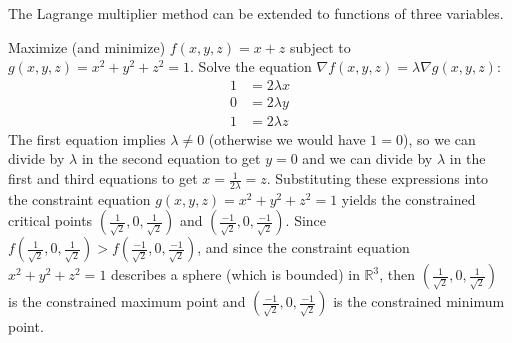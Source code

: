 The Lagrange multiplier method can be extended to functions of three variables.

\begin{example}\label{ex_lagr_3var}
Maximize (and minimize) $f(x,y,z) = x+z$ subject to $g(x,y,z) = x^2 + y^2 + z^2 = 1$.
\solution
Solve the equation $\nabla f(x,y,z) = \lambda \nabla g(x,y,z)$:
 \begin{align*}
  1 &= 2\lambda x\\
  0 &= 2\lambda y\\
  1 &= 2\lambda z
 \end{align*}
 The first equation implies $\lambda \ne 0$ (otherwise we would have $1=0$), so we can divide by $\lambda$ in the second equation to get $y=0$ and we can divide by $\lambda$ in the first and third equations to get $x=\frac1{2\lambda}=z$. Substituting these expressions into the constraint equation $g(x,y,z) = x^2 + y^2 + z^2 = 1$ yields the constrained critical points $\left( \frac1{\sqrt2},0,\frac1{\sqrt2} \right)$ and $\left( \frac{-1}{\sqrt2},0,\frac{-1}{\sqrt2}\right)$. Since $f\left( \frac1{\sqrt2},0,\frac1{\sqrt2}\right)>f\left(\frac{-1}{\sqrt2},0,\frac{-1}{\sqrt2}\right)$, and since the constraint equation $x^2 + y^2 + z^2 = 1$ describes a sphere (which is bounded) in $\mathbb{R}^3$, then $\left(\frac1{\sqrt2},0,\frac1{\sqrt2}\right)$ is the constrained maximum point and $\left(\frac{-1}{\sqrt2},0,\frac{-1}{\sqrt2}\right)$ is the constrained minimum point.
\end{example}

%

